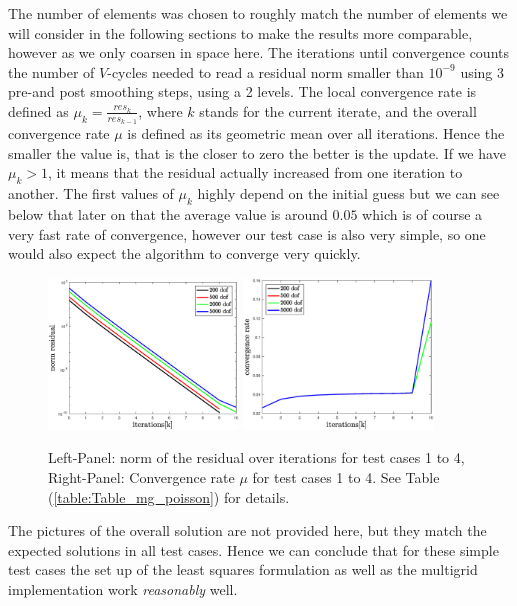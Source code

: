\documentclass[../draft_1.tex]{subfiles}
\begin{document}
The number of elements was chosen to roughly match the number of elements we will consider in the following sections to make the results more comparable, however as we only coarsen in space here. The iterations until convergence counts the number of $V$-cycles needed to read a residual norm smaller than $10^{-9}$ using 3 pre-and post smoothing steps, using a 2 levels. The local convergence rate is defined as $\mu_k = \frac{res_k}{res_{k-1}}$, where $k$ stands for the current iterate, and the overall convergence rate $\mu$ is defined as its geometric mean over all iterations. Hence the smaller the value is, that is the closer to zero the better is the update. If we have $\mu_k > 1$, it means that the residual actually increased from one iteration to another. The first values of $\mu_k$ highly depend on the initial guess but we can see below that later on that the average value is around $0.05$ which is of course a very fast rate of convergence, however our test case is also very simple, so one would also expect the algorithm to converge very quickly.

\begin{figure}[h!]
	\centering
	\includegraphics[width=0.45\textwidth]{images/implementation/poisson/residual_norm_mg}
	\includegraphics[width=0.45\textwidth]{images/implementation/poisson/convergence_rate_mg}
	\caption{Left-Panel: norm of the residual over iterations for test cases 1 to 4, Right-Panel: Convergence rate $\mu$ for test cases 1 to 4. See Table (\ref{table:Table_mg_poisson}) for details.}
	
\end{figure}
The pictures of the overall solution are not provided here, but they match the expected solutions in all test cases. Hence we can conclude that for these simple test cases the set up of the least squares formulation as well as the multigrid implementation work \textit{reasonably} well.
\end{document}
